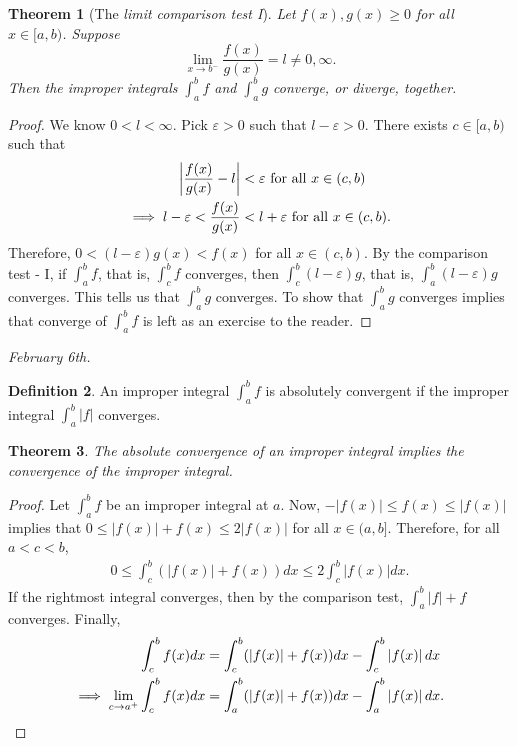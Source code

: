 \documentclass[15pt,a4paper]{book}
\newtheorem{theorem}{Theorem}[chapter]
\theoremstyle{definition}
\newtheorem{definition}[theorem]{Definition}
\newcommand{\eax}[1]{\emph{#1}\index{#1}} %
\newcommand{\abs}[1]{\left| #1 \right|} %
\begin{document}
\begin{theorem}[The \eax{limit comparison test I}]
    Let $f(x), g(x) \geq 0$ for all $x \in [a,b)$. Suppose
    \begin{equation*}
        \lim_{x \to b^{-}} \frac{f(x)}{g(x)} = l \neq 0, \infty.
    \end{equation*}
    Then the improper integrals $\int_{a}^{b} f$ and $\int_{a}^{b} g$ converge, or diverge, together.
\end{theorem}
\begin{proof}
    We know $0 < l < \infty$. Pick $\varepsilon > 0$ such that $l- \varepsilon > 0$. There exists $c \in [a,b)$ such that
    \begin{align}
        \abs{\frac{f(x)}{g(x)} - l} &< \varepsilon \text{ for all } x \in (c,b) \notag \\
        \implies l - \varepsilon < \frac{f(x)}{g(x)} &< l+\varepsilon \text{ for all } x \in (c,b).
    \end{align}
    Therefore, $0 < (l-\varepsilon) g(x) < f(x)$ for all $x \in (c,b)$. By the comparison test - I, if $\int_{a}^{b} f$, that is, $\int_{c}^{b} f$ converges, then $\int_{c}^{b} (l-\varepsilon) g$, that is, $\int_{a}^{b} (l-\varepsilon) g$ converges. This tells us that $\int_{a}^{b} g$ converges. To show that $\int_{a}^{b} g$ converges implies that converge of $\int_{a}^{b} f$ is left as an exercise to the reader.
\end{proof}

\textit{February 6th.}
\begin{definition}
    An improper integral $\int_{a}^{b} f$ is absolutely convergent if the improper integral $\int_{a}^{b} \abs{f}$ converges.
\end{definition}

\begin{theorem}
    The absolute convergence of an improper integral implies the convergence of the improper integral.
\end{theorem}
\begin{proof}
    Let $\int_{a}^{b}f$ be an improper integral at $a$. Now, $-\abs{f(x)} \leq f(x) \leq \abs{f(x)}$ implies that $0 \leq \abs{f(x)} + f(x) \leq 2\abs{f(x)}$ for all $x \in (a,b]$. Therefore, for all $a < c < b$,
    \begin{align}
        0 \leq \int_{c}^{b} (\abs{f(x)}+f(x))dx \leq 2 \int_{c}^{b} \abs{f(x)} dx.
    \end{align}
    If the rightmost integral converges, then by the comparison test, $\int_{a}^{b} \abs{f}+f$ converges. Finally,
    \begin{align}
        \int_{c}^{b} f(x)dx &= \int_{c}^{b} (\abs{f(x)}+f(x)) dx - \int_{c}^{b} \abs{f(x)} dx \notag \\
        \implies \lim_{c \to a^{+}} \int_{c}^{b} f(x)dx &= \int_{a}^{b} (\abs{f(x)}+f(x)) dx - \int_{a}^{b} \abs{f(x)} dx.
    \end{align}
\end{proof}
\end{document}

